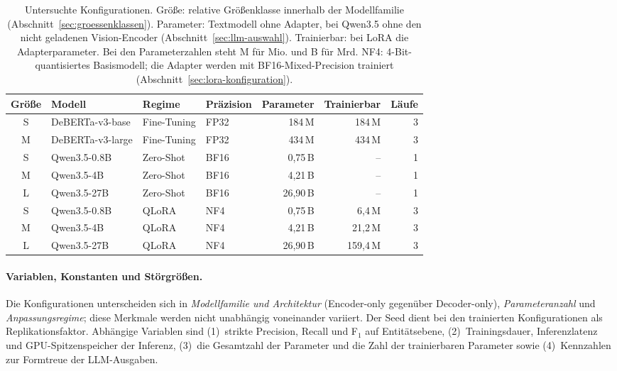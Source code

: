 \begin{table}[ht]
    \centering
    \small
    \caption[Untersuchte Konfigurationen]{Untersuchte Konfigurationen.
    Größe: relative Größenklasse innerhalb der Modellfamilie
    (Abschnitt~\ref{sec:groessenklassen}).
    Parameter: Textmodell ohne Adapter, bei Qwen3.5 ohne den nicht
    geladenen Vision-Encoder (Abschnitt~\ref{sec:llm-auswahl}).
    Trainierbar: bei LoRA die Adapterparameter.
    Bei den Parameterzahlen steht M für Mio. und B für Mrd.
    NF4: 4-Bit-quantisiertes Basismodell; die Adapter werden mit
    BF16-Mixed-Precision trainiert (Abschnitt~\ref{sec:lora-konfiguration}).}
    \label{tab:experiment-matrix}
    \setlength{\tabcolsep}{4pt}
    \begin{tabular}{clllrrr}
        \toprule
        \textbf{Größe} & \textbf{Modell} & \textbf{Regime} &
        \textbf{Präzision} & \textbf{Parameter} & \textbf{Trainierbar} &
        \textbf{Läufe} \\
        \midrule
        S & DeBERTa-v3-base  & Fine-Tuning & FP32 & 184\,M   & 184\,M   & 3 \\
        M & DeBERTa-v3-large & Fine-Tuning & FP32 & 434\,M   & 434\,M   & 3 \\
        S & Qwen3.5-0.8B     & Zero-Shot   & BF16 & 0,75\,B  & --       & 1 \\
        M & Qwen3.5-4B       & Zero-Shot   & BF16 & 4,21\,B  & --       & 1 \\
        L & Qwen3.5-27B      & Zero-Shot   & BF16 & 26,90\,B & --       & 1 \\
        S & Qwen3.5-0.8B     & QLoRA       & NF4  & 0,75\,B  & 6,4\,M   & 3 \\
        M & Qwen3.5-4B       & QLoRA       & NF4  & 4,21\,B  & 21,2\,M  & 3 \\
        L & Qwen3.5-27B      & QLoRA       & NF4  & 26,90\,B & 159,4\,M & 3 \\
        \bottomrule
    \end{tabular}
\end{table}

\paragraph{Variablen, Konstanten und Störgrößen.}
Die Konfigurationen unterscheiden sich in \emph{Modellfamilie und
Architektur} (Encoder-only gegenüber Decoder-only), \emph{Parameteranzahl}
und \emph{Anpassungsregime}; diese Merkmale werden nicht unabhängig
voneinander variiert. Der Seed dient bei den trainierten
Konfigurationen als Replikationsfaktor.
Abhängige Variablen sind
(1)~strikte Precision, Recall und F$_1$ auf Entitätsebene,
(2)~Trainingsdauer, Inferenzlatenz und GPU-Spitzenspeicher der Inferenz,
(3)~die Gesamtzahl der Parameter und die Zahl der trainierbaren
Parameter sowie
(4)~Kennzahlen zur Formtreue der LLM-Ausgaben.


